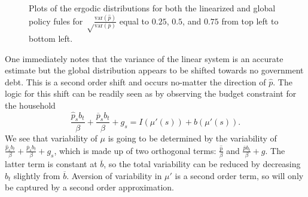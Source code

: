 \documentclass[12pt]{article}
\newcommand{\pbar}{{\overline p}}
\newcommand{\bbar}{{\overline b}}
\newcommand{\var}{{\text{var}}}
\begin{document}
\begin{figure}[ht]
	\caption{Plots of the ergodic distributions for both the linearized and global policy fules for $\sqrt\frac{\var (\hat p)}{\var (\pbar)}$ equal to $0.25$, $0.5$, and $0.75$ from top left to bottom left.\label{fig.erg_plot} }
\end{figure}  One immediately notes that the variance of the linear system is an accurate estimate but the global distribution appears to be shifted towards no government debt.  This is a second order shift and occurs no-matter the direction of $\hat p$.  The logic for this shift can be readily seen as by observing the budget constraint for the household
\[
	\frac{\hat p_s b_t}{\beta} + \frac{\pbar_s b_t}{\beta} + g_s = I(\mu'(s)) + b(\mu'(s)).
\]We see that variability of $\mu$ is going to be determined by the variability of $\frac{\hat p_s b_t}{\beta} + \frac{\pbar_s b_t}{\beta} + g_s$, which is made up of two orthogonal terms: $\frac{\hat p}{\beta}$ and $\frac{\pbar b_t}{\beta } + g$.  The latter term is constant at $\bbar$, so the total variability can be reduced by decreasing $b_t$ slightly from $\bbar$.  Aversion of variability in $\mu'$ is a second order term, so will only be captured by a second order approximation.
\end{document}
